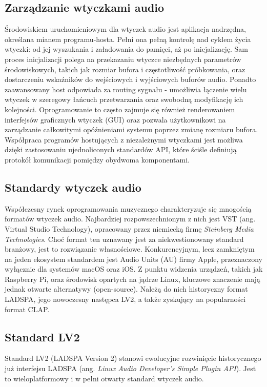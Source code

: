 \documentclass[12pt,a4paper]{report}
\begin{document}
\subsection{Zarządzanie wtyczkami audio}
Środowiskiem uruchomieniowym dla wtyczek audio jest aplikacja
nadrzędna, określana mianem programu-hosta. Pełni ona pełną kontrolę
nad cyklem życia wtyczki: od jej wyszukania i załadowania do pamięci,
aż po inicjalizację. Sam proces inicjalizacji polega na przekazaniu
wtyczce niezbędnych parametrów środowiskowych, takich jak rozmiar
bufora i częstotliwość próbkowania, oraz dostarczeniu wskaźników do
wejściowych i wyjściowych buforów audio. Ponadto zaawansowany host
odpowiada za routing sygnału - umożliwia łączenie wielu wtyczek w
szeregowy łańcuch przetwarzania oraz swobodną modyfikację ich
kolejności. Oprogramowanie to często zajmuje się również
renderowaniem interfejsów graficznych wtyczek (GUI) oraz pozwala
użytkownikowi na zarządzanie całkowitymi opóźnieniami systemu poprzez
zmianę rozmiaru bufora. Współpraca programów hostujących z
niezależnymi wtyczkami jest możliwa dzięki zastosowaniu
ujednoliconych standardów API, które ściśle definiują protokół
komunikacji pomiędzy obydwoma komponentami.

\subsection{Standardy wtyczek audio}
Współczesny rynek oprogramowania muzycznego charakteryzuje się
mnogością formatów wtyczek audio\cite{plugins_standards}. Najbardziej
rozpowszechnionym z
nich jest VST (ang. Virtual Studio Technology), opracowany przez
niemiecką firmę \textit{Steinberg Media
Technologies}\cite{wikipedia_vst}. Choć format
ten uznawany jest za niekwestionowany standard branżowy, jest to
rozwiązanie własnościowe. Konkurencyjnym, lecz zamkniętym na jeden
ekosystem standardem jest Audio Units (AU) firmy Apple, przeznaczony
wyłącznie dla systemów macOS oraz iOS. Z punktu widzenia urządzeń,
takich jak Raspberry Pi, oraz środowisk opartych na jądrze Linux,
kluczowe znaczenie mają jednak otwarte alternatywy (open-source).
Należą do nich historyczny format LADSPA, jego nowoczesny następca
LV2, a także zyskujący na popularności format CLAP.

\subsection{Standard LV2}
Standard LV2\cite{lv2_website}\cite{lv2_wikipedia} (LADSPA Version 2)
stanowi ewolucyjne rozwinięcie historycznego już interfejsu LADSPA
(ang. \textit{Linux Audio Developer's Simple Plugin API}). Jest to
wieloplatformowy i w pełni otwarty standard wtyczek audio.
\end{document}
